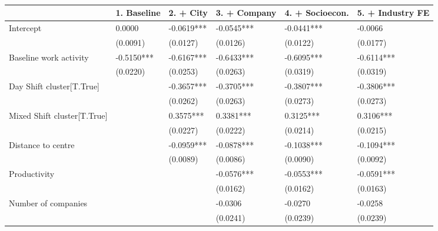 \begin{table}
\caption{}
\label{}
\begin{center}
\begin{tabular}{llllll}
\hline
                                     & 1. Baseline & 2. + City  & 3. + Company & 4. + Socioecon. & 5. + Industry FE  \\
\hline
Intercept                            & 0.0000      & -0.0619*** & -0.0545***   & -0.0441***      & -0.0066           \\
                                     & (0.0091)    & (0.0127)   & (0.0126)     & (0.0122)        & (0.0177)          \\
Baseline work activity         & -0.5150***  & -0.6167*** & -0.6433***   & -0.6095***      & -0.6114***        \\
                                     & (0.0220)    & (0.0253)   & (0.0263)     & (0.0319)        & (0.0319)          \\
Day Shift cluster[T.True]             &             & -0.3657*** & -0.3705***   & -0.3807***      & -0.3806***        \\
                                     &             & (0.0262)   & (0.0263)     & (0.0273)        & (0.0273)          \\
Mixed Shift cluster[T.True]             &             & 0.3575***  & 0.3381***    & 0.3125***       & 0.3106***         \\
                                     &             & (0.0227)   & (0.0222)     & (0.0214)        & (0.0215)          \\
Distance to centre                   &             & -0.0959*** & -0.0878***   & -0.1038***      & -0.1094***        \\
                                     &             & (0.0089)   & (0.0086)     & (0.0090)        & (0.0092)          \\
Productivity                         &             &            & -0.0576***   & -0.0553***      & -0.0591***        \\
                                     &             &            & (0.0162)     & (0.0162)        & (0.0163)          \\
Number of companies                         &             &            & -0.0306      & -0.0270         & -0.0258           \\
                                     &             &            & (0.0241)     & (0.0239)        & (0.0239)          \\

\end{tabular}
\end{center}
\end{table}
